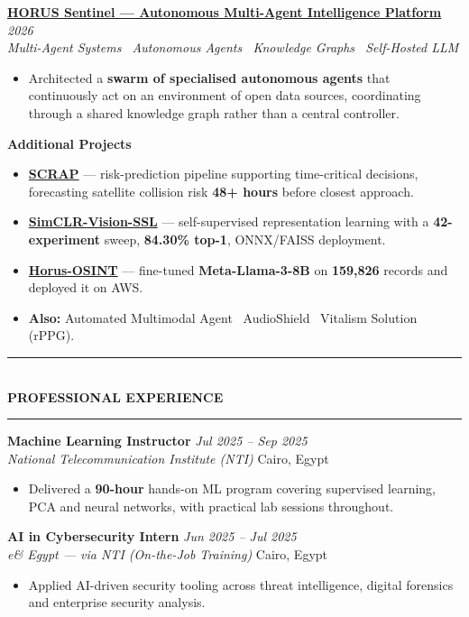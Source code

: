 \documentclass[10pt, a4paper]{article}
\newcommand{\cvsection}[1]{%
  \vspace{3pt}%
  {\color{navy}\rule{\linewidth}{1.1pt}}\\[0.5pt]%
  {\color{navy}\bfseries\fontsize{9.5}{11}\selectfont\uppercase{#1}}\\[-4pt]%
  {\color{teal}\rule{\linewidth}{0.6pt}}%
  \vspace{2pt}%
}
\newcommand{\cventry}[4]{%
  \vspace{2.5pt}%
  \textbf{\color{darkgray}#1} \hfill {\color{midgray}\textit{#3}}\\[-1.5pt]%
  {\color{teal}\textit{#2}} \hfill {\color{midgray}#4}%
}
\newcommand{\cvproject}[3]{%
  \vspace{2.5pt}%
  {\bfseries\color{navy}#1} \hfill {\color{midgray}\textit{#3}}\\[-1.5pt]%
  {\color{teal}\textit{#2}}%
}
\newcommand{\cvmini}[2]{\item {\bfseries\color{navy}#1} --- #2}
\newenvironment{cvitems}{%
  \begin{itemize}[leftmargin=11pt, itemsep=0.5pt, parsep=0pt, topsep=1pt,
                  label={\textcolor{teal}{$\bullet$}}]
}{%
  \end{itemize}%
}
\begin{document}
\cvproject{\href{https://github.com/MahmoudAlyosify/horus-sentinel}{HORUS Sentinel --- Autonomous Multi-Agent Intelligence Platform}}
          {Multi-Agent Systems \textperiodcentered\ Autonomous Agents \textperiodcentered\ Knowledge Graphs \textperiodcentered\ Self-Hosted LLM}
          {2026}
\begin{cvitems}
  \item Architected a \textbf{swarm of specialised autonomous agents} that continuously act on an environment of open data sources, coordinating through a shared knowledge graph rather than a central controller.
\end{cvitems}

\vspace{3pt}
{\bfseries\color{navy}Additional Projects}
\begin{cvitems}
  \cvmini{\href{https://github.com/MahmoudAlyosify/SCRAP-Satellite-Collision-Risk-Assessment-and-Prediction}{SCRAP}}{risk-prediction pipeline supporting time-critical decisions, forecasting satellite collision risk \textbf{48+ hours} before closest approach.}
  \cvmini{\href{https://github.com/MahmoudAlyosify/SimCLR-Vision-SSL}{SimCLR-Vision-SSL}}{self-supervised representation learning with a \textbf{42-experiment} sweep, \textbf{84.30\% top-1}, ONNX/FAISS deployment.}
  \cvmini{\href{https://github.com/MahmoudAlyosify/Horus-OSINT}{Horus-OSINT}}{fine-tuned \textbf{Meta-Llama-3-8B} on \textbf{159,826} records and deployed it on AWS.}
  \item \textbf{Also:} Automated Multimodal Agent \textperiodcentered\ AudioShield \textperiodcentered\ Vitalism Solution (rPPG).
\end{cvitems}

\cvsection{Professional Experience}

\cventry{Machine Learning Instructor}{National Telecommunication Institute (NTI)}
        {Jul 2025 -- Sep 2025}{Cairo, Egypt}
\begin{cvitems}
  \item Delivered a \textbf{90-hour} hands-on ML program covering supervised learning, PCA and neural networks, with practical lab sessions throughout.
\end{cvitems}

\cventry{AI in Cybersecurity Intern}{e\& Egypt --- via NTI (On-the-Job Training)}
        {Jun 2025 -- Jul 2025}{Cairo, Egypt}
\begin{cvitems}
  \item Applied AI-driven security tooling across threat intelligence, digital forensics and enterprise security analysis.
\end{cvitems}
\end{document}
